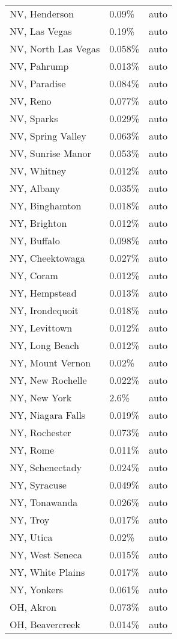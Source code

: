 \begin{longtable}[]{@{}lll@{}}
NV, Henderson & 0.09\% & auto \\
NV, Las Vegas & 0.19\% & auto \\
NV, North Las Vegas & 0.058\% & auto \\
NV, Pahrump & 0.013\% & auto \\
NV, Paradise & 0.084\% & auto \\
NV, Reno & 0.077\% & auto \\
NV, Sparks & 0.029\% & auto \\
NV, Spring Valley & 0.063\% & auto \\
NV, Sunrise Manor & 0.053\% & auto \\
NV, Whitney & 0.012\% & auto \\
NY, Albany & 0.035\% & auto \\
NY, Binghamton & 0.018\% & auto \\
NY, Brighton & 0.012\% & auto \\
NY, Buffalo & 0.098\% & auto \\
NY, Cheektowaga & 0.027\% & auto \\
NY, Coram & 0.012\% & auto \\
NY, Hempstead & 0.013\% & auto \\
NY, Irondequoit & 0.018\% & auto \\
NY, Levittown & 0.012\% & auto \\
NY, Long Beach & 0.012\% & auto \\
NY, Mount Vernon & 0.02\% & auto \\
NY, New Rochelle & 0.022\% & auto \\
NY, New York & 2.6\% & auto \\
NY, Niagara Falls & 0.019\% & auto \\
NY, Rochester & 0.073\% & auto \\
NY, Rome & 0.011\% & auto \\
NY, Schenectady & 0.024\% & auto \\
NY, Syracuse & 0.049\% & auto \\
NY, Tonawanda & 0.026\% & auto \\
NY, Troy & 0.017\% & auto \\
NY, Utica & 0.02\% & auto \\
NY, West Seneca & 0.015\% & auto \\
NY, White Plains & 0.017\% & auto \\
NY, Yonkers & 0.061\% & auto \\
OH, Akron & 0.073\% & auto \\
OH, Beavercreek & 0.014\% & auto \\

\end{longtable}
